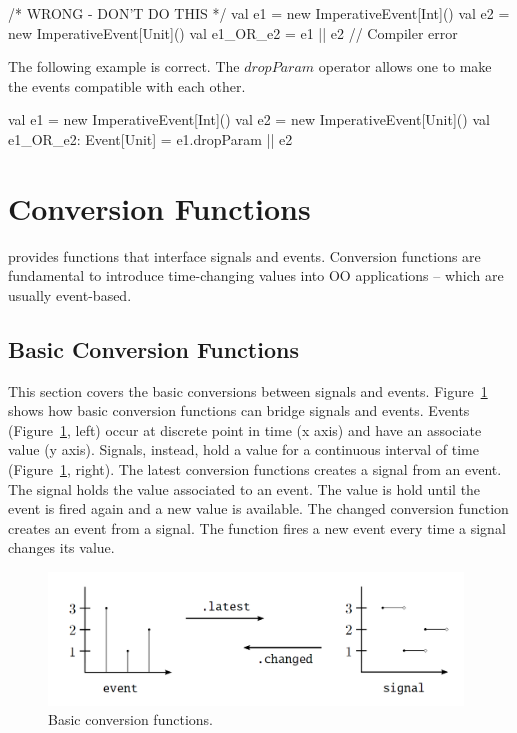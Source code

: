 \documentclass[10pt,a4paper]{article}
\newcommand{\code}[1]{{\fontfamily{cmtt}\small\selectfont#1}}
\newcommand{\REScala}{{\small \sc{REScala}}\xspace}
\begin{document}
\begin{codenv}     /* WRONG - DON'T DO THIS */
val e1 = new ImperativeEvent[Int]()
val e2 = new ImperativeEvent[Unit]()
val e1_OR_e2 = e1 || e2  // Compiler error
\end{codenv}

The following example is correct. The $dropParam$ operator allows
one to make the events compatible with each other.

\begin{codenv}
val e1 = new ImperativeEvent[Int]()
val e2 = new ImperativeEvent[Unit]()
val e1_OR_e2: Event[Unit] = e1.dropParam || e2
\end{codenv}



\newpage



\section{Conversion Functions}\label{sec:conv-fun}

\REScala provides functions that interface signals and
events. Conversion functions are fundamental to introduce
time-changing values into OO applications -- which are usually
event-based.



\subsection{Basic Conversion Functions}

This section covers the basic conversions between signals and events.
Figure~\ref{fig:event-signal} shows how basic conversion functions can
bridge signals and events. Events (Figure~\ref{fig:event-signal},
left) occur at discrete point in time (x axis) and have an associate
value (y axis). Signals, instead, hold a value for a continuous
interval of time (Figure~\ref{fig:event-signal}, right). The
\code{latest} conversion functions creates a signal from an event. The
signal holds the value associated to an event. The value is hold until
the event is fired again and a new value is available. The
\code{changed} conversion function creates an event from a signal. The
function fires a new event every time a signal changes its value.



\begin{figure}[tp]
\begin{center}
  \includegraphics[width=0.98\textwidth]{images/event-signal.png}
\end{center}
\vspace{-6mm}
\caption{Basic conversion functions.}
\label{fig:event-signal}
\end{figure}
\end{document}
